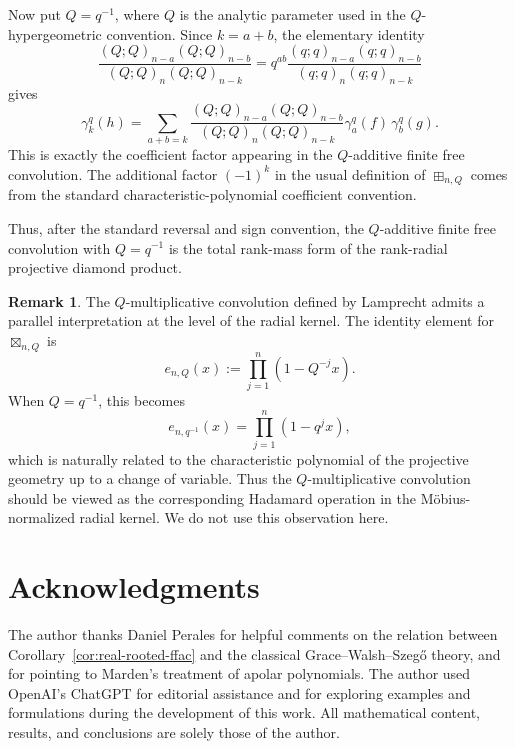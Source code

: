 \documentclass[11pt]{amsart}
\theoremstyle{definition}
\newtheorem{remark}[thm]{Remark}
\begin{document}
Now put $Q=q^{-1}$, where $Q$ is the analytic parameter used in the $Q$-hypergeometric convention. Since $k=a+b$, the elementary identity \[ 
    \frac{ (Q;Q)_{n-a}(Q;Q)_{n-b} }{ (Q;Q)_n(Q;Q)_{n-k} } = 
    q^{ab} \frac{ (q;q)_{n-a}(q;q)_{n-b} }{ (q;q)_n(q;q)_{n-k} } 
\] 
gives 
\[
    \gamma_k^q(h) = \sum_{a+b=k} \frac{ (Q;Q)_{n-a}(Q;Q)_{n-b} }{ (Q;Q)_n(Q;Q)_{n-k} } \gamma^q_a(f)\, \gamma^q_b(g). 
\] 
This is exactly the coefficient factor appearing in the $Q$-additive finite free convolution. 
The additional factor $(-1)^k$ in the usual definition of $\boxplus_{n,Q}$ comes from the standard characteristic-polynomial coefficient convention. 

Thus, after the standard reversal and sign convention, the \(Q\)-additive finite free convolution with $Q=q^{-1}$ is the total rank-mass form of the rank-radial projective diamond product.

\begin{remark} 
    The $Q$-multiplicative convolution defined by Lamprecht \cite{Lam16} admits a parallel interpretation at the level of the radial kernel. The identity element for $\boxtimes_{n,Q}$ is 
    \[ 
    e_{n,Q}(x) :=\prod_{j=1}^n(1-Q^{-j}x). 
    \] 
    When \(Q=q^{-1}\), this becomes 
    \[ 
        e_{n,q^{-1}}(x)=\prod_{j=1}^n(1-q^j x), 
    \] 
    which is naturally related to the characteristic polynomial of the projective geometry up to a change of variable. Thus the $Q$-multiplicative convolution should be viewed as the corresponding Hadamard operation in the M\"obius-normalized radial kernel. We do not use this observation here. 
\end{remark}




\section*{Acknowledgments}
The author thanks Daniel Perales for helpful comments on the relation between Corollary~\ref{cor:real-rooted-ffac} and the classical Grace--Walsh--Szeg\H{o} theory, and for pointing to Marden’s treatment of apolar polynomials.
The author used OpenAI’s ChatGPT for editorial assistance and for exploring examples and formulations during the development of this work. All mathematical content, results, and conclusions are solely those of the author.


\end{document}
